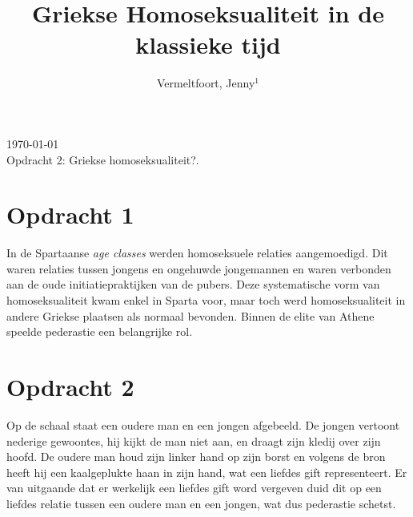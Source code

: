 \documentclass[10pt]{amsart}
\begin{document}
\setcounter{page}{1}

\hfill     {\small \today} \\
{\small Opdracht 2: Griekse homoseksualiteit?.}\hfill
{\small } %

\centerline{}

\centerline{}

\title[Griekse Homoseksualiteit]{Griekse Homoseksualiteit in de klassieke tijd}

\author[J. Vermeltfoort]{Vermeltfoort, Jenny$^1$}

\address{$^{1}$ 3787494, Faculteit Geesteswetenschappen, Leiden
     Universiteit, Leiden, Nederland.}
\email{\textcolor[rgb]{0.00,0.00,0.84}{j.vermeltfoort@umail.leidenuniv.nl}}


\maketitle

\section*{Opdracht 1}

\noindent In de Spartaanse \textit{age classes} werden homoseksuele relaties aangemoedigd. Dit waren relaties tussen jongens
en ongehuwde jongemannen en waren verbonden aan de oude initiatiepraktijken van de pubers. Deze systematische vorm van
homoseksualiteit kwam enkel in Sparta voor, maar toch werd homoseksualiteit in andere Griekse plaatsen als normaal
bevonden. Binnen de elite van Athene speelde pederastie een belangrijke
rol.\autocite{naereboutOudheidGriekenRomeinen2022}

\section*{Opdracht 2}
\noindent Op de schaal \autocite{dourisAtticRedFigure} staat een oudere man en een jongen afgebeeld. De jongen vertoont nederige
gewoontes, hij kijkt de man niet aan, en draagt zijn kledij over zijn hoofd. De oudere man houd zijn linker hand op
zijn borst en volgens de bron \autocite{dourisAtticRedFigure} heeft hij een kaalgeplukte haan in zijn hand, wat een
liefdes gift representeert. Er van uitgaande dat er werkelijk een liefdes gift word vergeven duid dit op een liefdes
relatie tussen een oudere man en een jongen, wat dus pederastie schetst.
\end{document}
